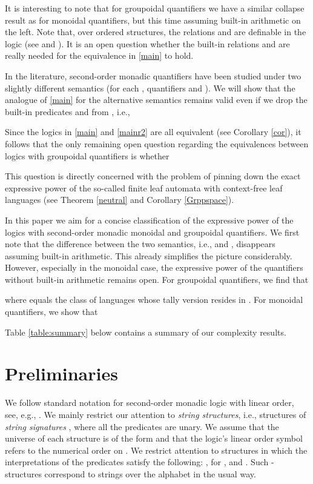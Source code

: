 \documentclass{LMCS}
\begin{document}
It is interesting to note that for  groupoidal quantifiers we have a similar collapse result as for monoidal quantifiers, but this time assuming  built-in arithmetic on the left. Note that, over ordered structures, the relations  and  are definable in the logic   (see \cite{baimst90} and \cite{lamcscvo01}).   It is  an open question whether the built-in relations  and  are really needed  for the equivalence in  \eqref{main} to hold.

In the literature,   second-order monadic quantifiers have been studied under two slightly different  semantics
(for each , quantifiers  and   ).  We will  show
that the analogue of \eqref{main} for the alternative  semantics  remains valid even if we drop the  built-in predicates  and  from , i.e.,

Since the logics in  \eqref{main} and \eqref{mainr2} are all equivalent (see Corollary \ref{cor}), it follows that the 
only remaining open question regarding the equivalences between  logics with groupoidal quantifiers  is whether

This question is directly concerned with the problem of pinning down the exact expressive power of the so-called finite leaf automata with
context-free leaf languages (see Theorem \ref{neutral} and Corollary \ref{Grppspace}). 

In this paper we aim for a concise classification of the expressive power of the  logics with second-order monadic monoidal and groupoidal quantifiers.
We first note that the difference  between the two semantics, i.e.,  and , disappears assuming  built-in arithmetic. This already simplifies the picture considerably. However, especially in the monoidal case, the expressive power of the quantifiers   without built-in arithmetic remains open.  For groupoidal quantifiers, we find that 

where   equals the class of languages whose tally version resides in .
For monoidal quantifiers, we show that  

Table \ref{table:summary} below contains a  summary of  our complexity results. 

\section{Preliminaries}



\noindent We follow standard notation for second-order monadic logic
with linear order, see, e.g., \cite{str94}. We mainly restrict our
attention to {\em string structures}, i.e., structures of {\em string
  signatures} , where all
the predicates  are unary. We assume that the universe
 of each structure  is of the form 
and that the logic's linear order symbol refers to the numerical order
on . We restrict attention to structures  in
which the interpretations  of the predicates 
satisfy the following: ,
for , and . Such
-structures correspond to strings over the alphabet
 in the usual way.
\end{document}
